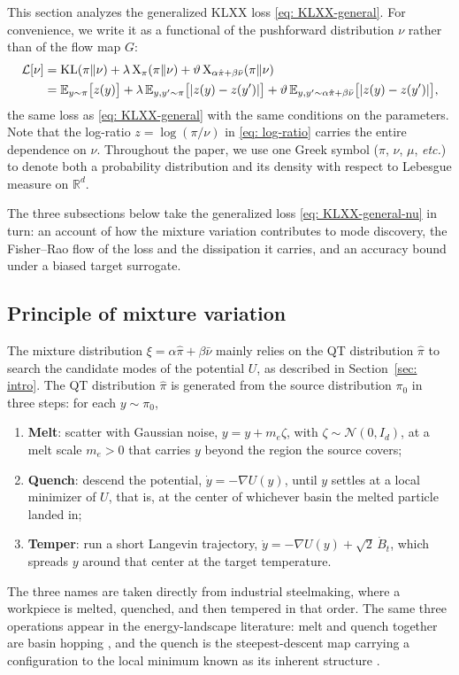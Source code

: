 \documentclass{article}
\begin{document}
This section analyzes the generalized KLXX loss \eqref{eq: KLXX-general}. For convenience, we write it as a functional of the pushforward distribution $\nu$ rather than of the flow map $G$:
\begin{align}
	\mathcal L[\nu] & =  \mathrm{KL}(\pi\|\nu) + \lambda\,\mathrm{X}_\pi(\pi\|\nu) + \vartheta\,\mathrm{X}_{\alpha\hat\pi+\beta\bar\nu}(\pi\|\nu) \notag \\
	& = \mathbb E_{y\sim\pi}\big[z(y)\big] +  \lambda\, \mathbb E_{y,y'\sim\pi}\big[|z(y)-z(y')|\big] + \vartheta\, \mathbb E_{y,y'\sim \alpha\hat\pi+\beta\bar\nu}\big[|z(y)-z(y')|\big],
	\label{eq: KLXX-general-nu}
\end{align}
the same loss as \eqref{eq: KLXX-general} with the same conditions on the parameters. Note that the log-ratio $z = \log(\pi/\nu)$ in \eqref{eq: log-ratio} carries the entire dependence on $\nu$. Throughout the paper, we use one Greek symbol ($\pi$, $\nu$, $\mu$, \emph{etc.}) to denote both a probability distribution and its density with respect to Lebesgue measure on $\mathbb R^d$.

The three subsections below take the generalized loss \eqref{eq: KLXX-general-nu} in turn: an account of how the mixture variation contributes to mode discovery, the Fisher--Rao flow of the loss and the dissipation it carries, and an accuracy bound under a biased target surrogate.

\subsection{Principle of mixture variation}
\label{subsec: mixture-variation}

The mixture distribution $\xi = \alpha\hat\pi+\beta\bar\nu$ mainly relies on the QT distribution $\hat\pi$ to search the candidate modes of the potential $U$, as described in Section~\ref{sec: intro}. The QT distribution $\hat\pi$ is generated from the source distribution $\pi_0$ in three steps: for each $y\sim \pi_0$,
\begin{enumerate}
	\setlength{\itemsep}{0pt}
	\item \textbf{Melt}: scatter with Gaussian noise, $y = y+m_e\zeta$, with $\zeta\sim \mathcal N(0,I_d)$, at a melt scale $m_e>0$ that carries $y$ beyond the region the source covers;
	\item \textbf{Quench}: descend the potential, $\dot y = -\nabla U(y)$, until $y$ settles at a local minimizer of $U$, that is, at the center of whichever basin the melted particle landed in;
	\item \textbf{Temper}: run a short Langevin trajectory, $\dot y = -\nabla U(y)+\sqrt 2\,\dot B_t$, which spreads $y$ around that center at the target temperature.
\end{enumerate}
The three names are taken directly from industrial steelmaking, where a workpiece is melted, quenched, and then tempered in that order. The same three operations appear in the energy-landscape literature: melt and quench together are basin hopping \citep{wales1997global}, and the quench is the steepest-descent map carrying a configuration to the local minimum known as its inherent structure \citep{stillinger1982hidden}.
\end{document}
